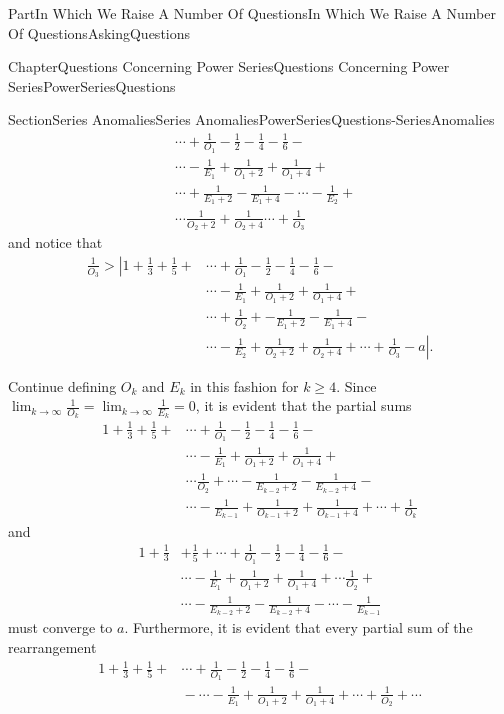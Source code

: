 \documentclass[oneside,10pt,]{book}
\numberwithin{equation}{part}
\def\limit#1#2#3{{\displaystyle\lim_{#1\rightarrow #2}#3}}
\newcommand{\gt}{>}
\newcommand{\amp}{&}
\begin{document}
\begin{partptx}{Part}{In Which We Raise A Number Of Questions}{}{In Which We Raise A Number Of Questions}{}{}{AskingQuestions}
\begin{chapterptx}{Chapter}{Questions Concerning Power Series}{}{Questions Concerning Power Series}{}{}{PowerSeriesQuestions}
\begin{sectionptx}{Section}{Series Anomalies}{}{Series Anomalies}{}{}{PowerSeriesQuestions-SeriesAnomalies}
\begin{align*}
\amp{}\cdots+\frac{1}{O_1}-\frac{1}{2}-\frac{1}{4}- \frac{1}{6}-\\
\amp{}\cdots
-\frac{1}{E_1}+\frac{1}{O_1+2}+\frac{1}{O_1+4}+\\
\amp{}\cdots+\frac{1}{E_1+2}-\frac{1}{E_1+4}-\cdots -\frac{1}{E_2} +\\
\amp{} \cdots \frac{1}{O_2+2} + \frac{1}{O_2+4}\cdots+\frac{1}{O_3}
\end{align*}
and notice that%
\begin{align*}
\frac{1}{O_3}\gt          \left|1+\frac{1}{3}\right.
+\frac{1}{5}+\amp{}\cdots+\frac{1}{O_1}-\frac{1}{2}-\frac{1}{4}-\frac{1}{6}-\\
\amp
\cdots-\frac{1}{E_1}+\frac{1}{O_1+2}+\frac{1}{O_1+4}+\\
\amp \cdots+ \frac{1}{O_2}+
-\frac{1}{E_1+2}-\frac{1}{E_1+4}-\\
\amp{}\cdots-\frac{1}{E_2}+\frac{1}{O_2+2}+
\frac{1}{O_2+4}+\cdots+\left.\frac{1}{O_3}-a\right|\text{.}
\end{align*}
%
\par
Continue defining \(O_k\) and \(E_k\) in this fashion for \(k\ge 4\). Since \(\limit{k}{\infty}{\frac{1}{O_k}}=\limit{k}{\infty}{\frac{1}{E_k}}=0\), it is evident that the partial sums%
\begin{align*}
1+\frac{1}{3} +\frac{1}{5}+\amp{}\cdots+\frac{1}{O_1}-\frac{1}{2}-\frac{1}{4}-\frac{1}{6}-\\
\amp \cdots-\frac{1}{E_1}+\frac{1}{O_1+2}+\frac{1}{O_1+4}+\\
\amp \cdots \frac{1}{O_2}+\cdots -\frac{1}{E_{k-2}+2}-\frac{1}{E_{k-2}+4}-\\
\amp \cdots-\frac{1}{E_{k-1}}+  \frac{1}{O_{k-1}+2}+\frac{1}{O_{k-1}+4}+\cdots+\frac{1}{O_k}
\end{align*}
and%
\begin{align*}
1+\frac{1}{3}\amp
+\frac{1}{5}+\cdots+\frac{1}{O_1}-\frac{1}{2}-\frac{1}{4}-
\frac{1}{6}-\\
\amp \cdots-\frac{1}{E_1}+\frac{1}{O_1+2}+\frac{1}{O_1+4}+
\cdots{} \frac{1}{O_2}+\\
\amp
\cdots-\frac{1}{E_{k-2}+2}-\frac{1}{E_{k-2}+4}-\cdots-\frac{1}{E_{k-1}}
\end{align*}
must converge to \(a\). Furthermore, it is evident that every partial sum of the rearrangement%
\begin{align*}
1+\frac{1}{3} +\frac{1}{5}+\amp\cdots+\frac{1}{O_1}-\frac{1}{2}-\frac{1}{4}- \frac{1}{6}-\\
\amp{}-\cdots-\frac{1}{E_1}+\frac{1}{O_1+2}+\frac{1}{O_1+4}+\cdots+ \frac{1}{O_2}+\cdots

\end{align*}
\end{sectionptx}
\end{chapterptx}
\end{partptx}
\end{document}
